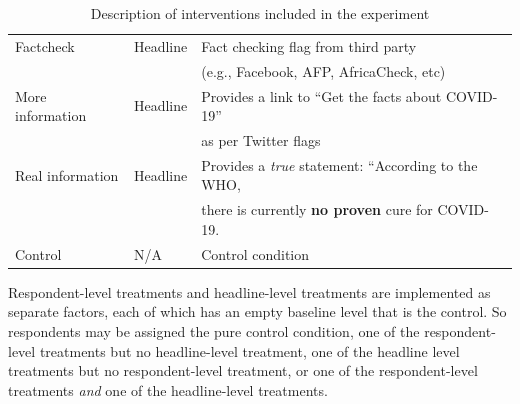 \documentclass[letterpaper, 12pt, parskip=full,]{scrartcl}
\begin{document}
\begin{table}[H]
\begin{tabular}{l|l|l}
Factcheck                                                                                                      & Headline                                                                                                     & Fact checking flag from third party\\ & & (e.g., Facebook, AFP, AfricaCheck, etc)
 \\
More information                                                                                                      & Headline                                                                                                     & Provides a link to ``Get the facts about COVID-19''\\ & & as per Twitter flags
 \\
 Real information                                                                                                      & Headline                                                                                                     & Provides a \textit{true} statement: ``According to the WHO,\\ & & there is currently \textbf{no proven} cure for COVID-19.
 \\
Control                                                                                                        & N/A                                                                                                          & Control condition                                                                                                                                                                                                                                                                                                                                                                                              
\end{tabular}
\caption{Description of interventions included in the experiment}
\label{tab:treatments}
\end{table}

Respondent-level treatments and headline-level treatments are implemented as separate factors, each of which has an empty baseline level that is the control. So respondents may be assigned the pure control condition, one of the respondent-level treatments but no headline-level treatment, one of the headline level treatments but no respondent-level treatment, or one of the respondent-level treatments \textit{and} one of the headline-level treatments. 
\end{document}
